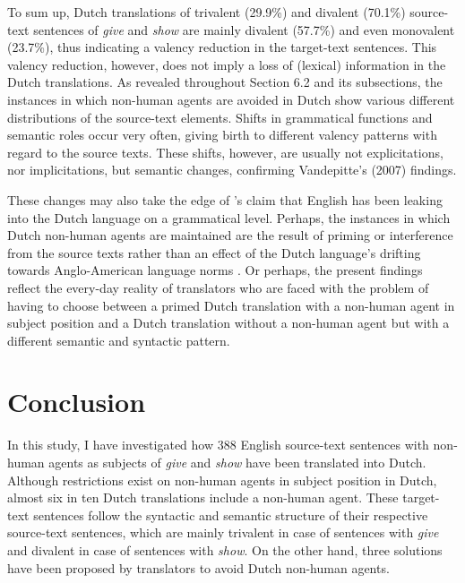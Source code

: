 \documentclass[output=paper]{LSP/langsci}
\begin{document}
To sum up, Dutch translations of trivalent (29.9\%) and divalent (70.1\%) source-text sentences of \textit{give} and \textit{show} are mainly divalent (57.7\%) and even monovalent (23.7\%), thus indicating a valency reduction in the target-text sentences. This valency reduction, however, does not imply a loss of (lexical) information in the Dutch translations. As revealed throughout Section 6.2 and its subsections, the instances in which non-human agents are avoided in Dutch show various different distributions of the source-text elements. Shifts in grammatical functions and semantic roles occur very often, giving birth to different valency patterns with regard to the source texts. These shifts, however, are usually not explicitations, nor implicitations, but semantic changes, confirming Vandepitte’s (2007) findings.

These changes may also take the edge of \citeauthor{Delsoir2011}'s \citeyear{Delsoir2011} claim that English has been leaking into the Dutch language on a grammatical level. Perhaps, the instances in which Dutch non-human agents are maintained are the result of priming \citep[see e.g.][]{Vandepitte2011,Delsoir2011} or interference from the source texts rather than an effect of the Dutch language’s drifting towards Anglo-American language norms \citep[see e.g.][]{House2008}. Or perhaps, the present findings reflect the every-day reality of translators who are faced with the problem of having to choose between a primed Dutch translation with a non-human agent in subject position and a Dutch translation without a non-human agent but with a different semantic and syntactic pattern. 

\section{Conclusion}

In this study, I have investigated how 388 English source-text sentences with non-human agents as subjects of \textit{give} and \textit{show} have been translated into Dutch. Although restrictions exist on non-human agents in subject position in Dutch, almost six in ten Dutch translations include a non-human agent. These target-text sentences follow the syntactic and semantic structure of their respective source-text sentences, which are mainly trivalent in case of sentences with \textit{give} and divalent in case of sentences with \textit{show}. On the other hand, three solutions have been proposed by translators to avoid Dutch non-human agents.
\end{document}
